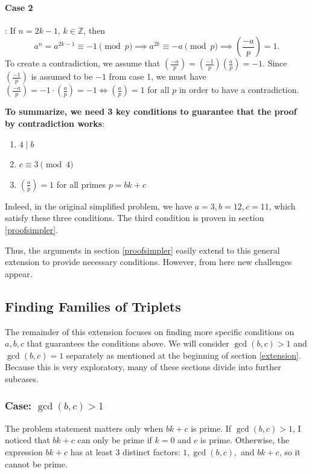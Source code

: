 \documentclass{article}
\newcommand{\Z}{\mathbb{Z}}
\newcommand{\qrn}[2]{\left( \frac{#1}{#2}\right)}
\begin{document}
\paragraph{Case 2}: If $n = 2k-1, \hspace{2pt} k \in \Z$, then \[a^{n} = a^{2k-1} \equiv -1 \pmod p \implies a^{2k} \equiv -a \pmod p \implies \qrn{-a}{p} = 1.\] To create a contradiction, we assume that $\qrn{-a}{p}=\qrn{-1}{p}\qrn{a}{p}=-1$. Since $\qrn{-1}{p}$ is assumed to be $-1$ from case 1, we must have $\qrn{-a}{p}=-1 \cdot \qrn{a}{p}=-1 \iff \qrn{a}{p} = 1$ for all $p$ in order to have a contradiction.

\textbf{To summarize, we need 3 key conditions to guarantee that the proof by contradiction works}: 
\begin{enumerate}
    \item $4 \mid b$
    \item $c \equiv 3 \pmod 4$
    \item $\qrn{a}{p}=1$ for all primes $p=bk+c$
\end{enumerate}

Indeed, in the original simplified problem, we have $a=3, b=12, c=11$, which satisfy these three conditions. The third condition is proven in section \ref{proofsimpler}.

Thus, the arguments in section \ref{proofsimpler} easily extend to this general extension to provide necessary conditions. However, from here new challenges appear.
\subsection{Finding Families of Triplets}
The remainder of this extension focuses on finding more specific conditions on $a,b,c$ that guarantees the conditions above. We will consider $\gcd(b,c)>1$ and $\gcd(b,c)=1$ separately as mentioned at the beginning of section \ref{extension}. Because this is very exploratory, many of these sections divide into further subcases.

\subsubsection{Case: $\gcd(b,c)>1$}
The problem statement matters only when $bk+c$ is prime. If $\gcd(b,c)>1$, I noticed that $bk+c$ can only be prime if $k=0$ and $c$ is prime. Otherwise, the expression $bk+c$ has at least 3 distinct factors: $1, \gcd(b,c),$ and $bk+c$, so it cannot be prime.
\end{document}
